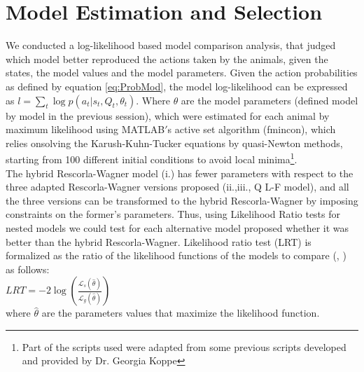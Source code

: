 \section{Model Estimation and Selection}
\label{sec:Behavior}
We conducted a log-likelihood based model comparison analysis, that judged which model better reproduced the actions taken by the animals, given the states, the model values and the model parameters. Given the action probabilities as defined by equation \ref{eq:ProbMod}, the model log-likelihood can be expressed as $l=\sum_{t} \log p(a_t|s_t,Q_t,\theta_t)$. Where $\theta$ are the model parameters (defined model by model in the previous session), which were estimated for each animal by maximum likelihood using MATLAB$'$s active set algorithm (fmincon), which relies onsolving the Karush-Kuhn-Tucker equations by quasi-Newton methods, starting from 100 different initial conditions to avoid local minima\footnote{Part of the scripts used were adapted from some previous scripts developed and provided by Dr. Georgia Koppe}.\\
The hybrid Rescorla-Wagner model (i.) has fewer parameters with respect to the three adapted Rescorla-Wagner versions proposed (ii.,iii., Q L-F model), and all the three versions can be transformed to the hybrid Rescorla-Wagner by imposing constraints on the former's parameters. Thus, using Likelihood Ratio tests for nested models we could test for each alternative model proposed whether it was better than the hybrid Rescorla-Wagner. Likelihood ratio test (LRT) is formalized as the ratio of the likelihood functions of the models to compare (\cite{NeymanPearson}, \cite{King}) as follows:\\
 \hspace{5cm} $LRT = -2 \log (\frac{\mathcal{L}_s(\hat{\theta})}{\mathcal{L}_g(\hat{\theta})})$\\
where $\hat{\theta}$ are the parameters values that maximize the likelihood function.
